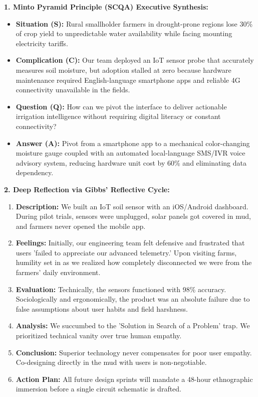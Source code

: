 \begin{solbox}
\textbf{1. Minto Pyramid Principle (SCQA) Executive Synthesis:}\\
\begin{itemize}
    \item \textbf{Situation (S):} Rural smallholder farmers in drought-prone regions lose 30\% of crop yield to unpredictable water availability while facing mounting electricity tariffs.
    \item \textbf{Complication (C):} Our team deployed an IoT sensor probe that accurately measures soil moisture, but adoption stalled at zero because hardware maintenance required English-language smartphone apps and reliable 4G connectivity unavailable in the fields.
    \item \textbf{Question (Q):} How can we pivot the interface to deliver actionable irrigation intelligence without requiring digital literacy or constant connectivity?
    \item \textbf{Answer (A):} Pivot from a smartphone app to a mechanical color-changing moisture gauge coupled with an automated local-language SMS/IVR voice advisory system, reducing hardware unit cost by 60\% and eliminating data dependency.
\end{itemize}

\textbf{2. Deep Reflection via Gibbs' Reflective Cycle:}\\
\begin{enumerate}[label=(\alph*)]
    \item \textbf{Description:} We built an IoT soil sensor with an iOS/Android dashboard. During pilot trials, sensors were unplugged, solar panels got covered in mud, and farmers never opened the mobile app.
    \item \textbf{Feelings:} Initially, our engineering team felt defensive and frustrated that users 'failed to appreciate our advanced telemetry.' Upon visiting farms, humility set in as we realized how completely disconnected we were from the farmers' daily environment.
    \item \textbf{Evaluation:} Technically, the sensors functioned with 98\% accuracy. Sociologically and ergonomically, the product was an absolute failure due to false assumptions about user habits and field harshness.
    \item \textbf{Analysis:} We succumbed to the 'Solution in Search of a Problem' trap. We prioritized technical vanity over true human empathy.
    \item \textbf{Conclusion:} Superior technology never compensates for poor user empathy. Co-designing directly in the mud with users is non-negotiable.
    \item \textbf{Action Plan:} All future design sprints will mandate a 48-hour ethnographic immersion before a single circuit schematic is drafted.
\end{enumerate}


\end{solbox}
